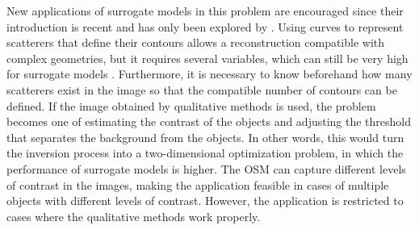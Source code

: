 		
		New applications of surrogate models in this problem are encouraged since their introduction is recent and has only been explored by \cite{salucci2022learned}. Using curves to represent scatterers that define their contours allows a reconstruction compatible with complex geometries, but it requires several variables, which can still be very high for surrogate models \citep{wu2019developed}. Furthermore, it is necessary to know beforehand how many scatterers exist in the image so that the compatible number of contours can be defined. If the image obtained by qualitative methods is used, the problem becomes one of estimating the contrast of the objects and adjusting the threshold that separates the background from the objects. In other words, this would turn the inversion process into a two-dimensional optimization problem, in which the performance of surrogate models is higher. The OSM can capture different levels of contrast in the images, making the application feasible in cases of multiple objects with different levels of contrast. However, the application is restricted to cases where the qualitative methods work properly.
		
